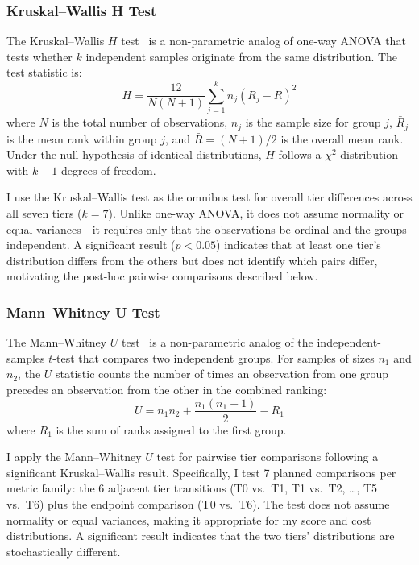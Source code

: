 \documentclass[11pt]{article}
\begin{document}
\subsubsection{Kruskal--Wallis H Test}
\label{sec:kruskal_wallis}

The Kruskal--Wallis $H$ test~\cite{kruskal1952use} is a non-parametric analog
of one-way ANOVA that tests whether $k$ independent samples originate from the
same distribution. The test statistic is:
\begin{equation}
  H = \frac{12}{N(N+1)} \sum_{j=1}^{k} n_j \left(\bar{R}_j - \bar{R}\right)^2
\end{equation}
where $N$ is the total number of observations, $n_j$ is the sample size for
group $j$, $\bar{R}_j$ is the mean rank within group $j$, and $\bar{R} =
(N+1)/2$ is the overall mean rank. Under the null hypothesis of identical
distributions, $H$ follows a $\chi^2$ distribution with $k-1$ degrees of
freedom.

I use the Kruskal--Wallis test as the omnibus test for overall tier
differences across all seven tiers ($k = 7$). Unlike one-way ANOVA, it does
not assume normality or equal variances---it requires only that the
observations be ordinal and the groups independent. A significant result
($p < 0.05$) indicates that at least one tier's distribution differs from the
others but does not identify which pairs differ, motivating the post-hoc
pairwise comparisons described below.

\subsubsection{Mann--Whitney U Test}
\label{sec:mann_whitney}

The Mann--Whitney $U$ test~\cite{mann1947test} is a non-parametric analog of
the independent-samples $t$-test that compares two independent groups. For
samples of sizes $n_1$ and $n_2$, the $U$ statistic counts the number of
times an observation from one group precedes an observation from the other in
the combined ranking:
\begin{equation}
  U = n_1 n_2 + \frac{n_1(n_1+1)}{2} - R_1
\end{equation}
where $R_1$ is the sum of ranks assigned to the first group.

I apply the Mann--Whitney $U$ test for pairwise tier comparisons following a
significant Kruskal--Wallis result. Specifically, I test 7 planned
comparisons per metric family: the 6 adjacent tier transitions (T0 vs.\ T1,
T1 vs.\ T2, \ldots, T5 vs.\ T6) plus the endpoint comparison (T0 vs.\ T6).
The test does not assume normality or equal variances, making it appropriate
for my score and cost distributions. A significant result indicates that the
two tiers' distributions are stochastically different.
\end{document}
